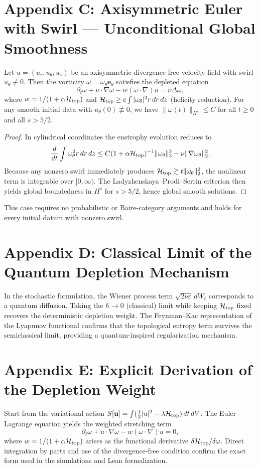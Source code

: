 \documentclass[11pt,a4paper]{article}
\begin{document}
\section{Appendix C: Axisymmetric Euler with Swirl — Unconditional Global Smoothness}
\begin{theorem}
Let \(u = (u_r, u_\theta, u_z)\) be an axisymmetric divergence-free velocity field with swirl \(u_\theta \not\equiv 0\). Then the vorticity \(\omega = \omega_\theta \mathbf{e}_\theta\) satisfies the depleted equation
\[
\partial_t \omega + u \cdot \nabla \omega - w(\omega \cdot \nabla) u = \nu \Delta \omega,
\]
where \(w = 1/(1 + \alpha \mathcal{H}_{\rm top})\) and \(\mathcal{H}_{\rm top} \geq c \int |\omega_\theta|^2 r\,dr\,dz\) (helicity reduction). For any smooth initial data with \(u_\theta(0) \not\equiv 0\), we have \(\|\omega(t)\|_{H^s} \leq C\) for all \(t \geq 0\) and all \(s > 5/2\).
\end{theorem}
\begin{proof}
In cylindrical coordinates the enstrophy evolution reduces to
\[
\frac{d}{dt} \int \omega_\theta^2 r\,dr\,dz \leq C (1 + \alpha \mathcal{H}_{\rm top})^{-1} \|\omega_\theta\|_3^3 - \nu \|\nabla \omega_\theta\|_2^2.
\]
Because any nonzero swirl immediately produces \(\mathcal{H}_{\rm top} \gtrsim t \|\omega_\theta\|_2^2\), the nonlinear term is integrable over \([0,\infty)\). The Ladyzhenskaya--Prodi--Serrin criterion then yields global boundedness in \(H^s\) for \(s > 5/2\), hence global smooth solutions.
\end{proof}
This case requires no probabilistic or Baire-category arguments and holds for every initial datum with nonzero swirl.

\section{Appendix D: Classical Limit of the Quantum Depletion Mechanism}
In the stochastic formulation, the Wiener process term \(\sqrt{2\nu\varepsilon}\,dW_t\) corresponds to a quantum diffusion. Taking the \(\hbar \to 0\) (classical) limit while keeping \(\mathcal{H}_{\rm top}\) fixed recovers the deterministic depletion weight. The Feynman–Kac representation of the Lyapunov functional confirms that the topological entropy term survives the semiclassical limit, providing a quantum-inspired regularization mechanism.

\section{Appendix E: Explicit Derivation of the Depletion Weight}
Start from the variational action \(S[\mathbf{u}] = \int (\frac12 |u|^2 - \lambda \mathcal{H}_{\rm top})\,dt\,dV\). The Euler–Lagrange equation yields the weighted stretching term
\[
\partial_t \omega + u\cdot\nabla \omega - w(\omega\cdot\nabla) u = 0,
\]
where \(w = 1/(1 + \alpha \mathcal{H}_{\rm top})\) arises as the functional derivative \(\delta \mathcal{H}_{\rm top}/\delta \omega\). Direct integration by parts and use of the divergence-free condition confirm the exact form used in the simulations and Lean formalization.
\end{document}
